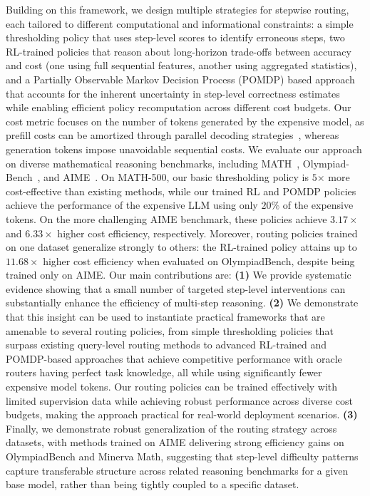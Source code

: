 \documentclass{article}
\theoremstyle{plain}
\theoremstyle{definition}
\theoremstyle{remark}
\begin{document}
Building on this framework, we design multiple strategies for stepwise routing, each tailored to different computational and informational constraints: a simple thresholding policy that uses step-level scores to identify erroneous steps, two RL-trained policies that reason about long-horizon trade-offs between accuracy and cost (one using full sequential features, another using aggregated statistics), and a Partially Observable Markov Decision Process (POMDP) based approach
that accounts for the inherent uncertainty in step-level correctness estimates while enabling efficient policy recomputation across different cost budgets. Our cost metric focuses on the number of tokens generated by the expensive model, as prefill costs can be amortized through parallel decoding strategies~\citep{speculative, medusa}, whereas generation tokens impose unavoidable sequential costs. We evaluate our approach on diverse mathematical reasoning benchmarks, including MATH~\citep{math}, Olympiad-Bench~\citep{olympiadbench}, and AIME~\citep{aime}. On MATH-500, our basic thresholding policy is $5$× more cost-effective than existing methods, while our trained RL and POMDP policies achieve the performance of the expensive LLM using only $20\%$ of the expensive tokens. On the more challenging AIME benchmark, these policies achieve $3.17\times$ and $6.33\times$ higher cost efficiency, respectively. Moreover, routing policies trained on one dataset generalize strongly to others: the RL-trained policy attains up to $11.68\times$ higher cost efficiency when evaluated on OlympiadBench, despite being trained only on AIME.
Our main contributions are: \textbf{(1)} We provide systematic evidence showing that a small number of targeted step-level interventions can substantially enhance the efficiency of multi-step reasoning.
\textbf{(2)} We demonstrate that this insight can be used to instantiate practical frameworks that are amenable to several routing policies, from simple thresholding policies that surpass existing query-level routing methods to advanced RL-trained and POMDP-based approaches that achieve competitive performance with oracle routers having perfect task knowledge, all while using significantly fewer expensive model tokens. Our routing policies can be trained effectively with limited supervision data while achieving robust performance across diverse cost budgets, making the approach practical for real-world deployment scenarios. \textbf{(3)} Finally, we demonstrate robust generalization of the routing strategy across datasets, with methods trained on AIME delivering strong efficiency gains on OlympiadBench and Minerva Math, suggesting that step-level difficulty patterns capture transferable structure across related reasoning benchmarks for a given base model, rather than being tightly coupled to a specific dataset.
\end{document}

